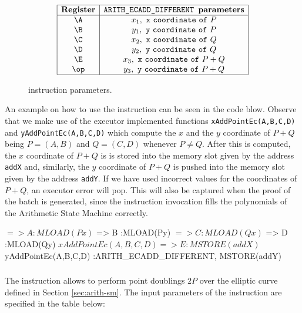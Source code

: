 \begin{figure}[h!]
    \renewcommand{\figurename}{Table}
    \[
    \begin{array}{|c|c|}
        \hline
        \mathbf{Register} &\texttt{ARITH\_ECADD\_DIFFERENT } \textbf{parameters} \\ \hline
        \A & x_1, \mathtt{~x~coordinate~of~}P \\
        \B & y_1, \mathtt{~y~coordinate~of~}P \\
        \C & x_2, \mathtt{~x~coordinate~of~}Q \\
        \D & y_2, \mathtt{~y~coordinate~of~}Q \\
        \E & x_3, \mathtt{~x~coordinate~of~}P+Q \\
        \op & y_3, \mathtt{~y~coordinate~of~}P+Q \\
        \hline
    \end{array}
    \]
    \caption{\ARITHADDDIFF instruction parameters.}
    \label{tab:memory-first-example}
\end{figure}

An example on how to use the \ARITHADDDIFF instruction can be seen in the code blow. Observe that we make use of the executor implemented functions \texttt{xAddPointEc(A,B,C,D)} and \texttt{yAddPointEc(A,B,C,D)} which compute the $x$ and the $y$ coordinate of $P + Q$ being $P = (A, B)$ and $Q = (C, D)$ whenever $P \neq Q$. After this is computed, the $x$ coordinate of $P + Q$ is is stored into the memory slot given by the address \texttt{addX} and, similarly, the $y$ coordinate of $P + Q$ is pushed into the memory slot given by the address \texttt{addY}. If we have used incorrect values for the coordinates of $P + Q$, an executor error will pop. This will also be captured when the proof of the batch is generated, since the instruction invocation fills the polynomials of the Arithmetic State Machine correctly. 

\begin{zkasm}
$ => A  						:MLOAD(Px)
$ => B  						:MLOAD(Py)
$ => C  						:MLOAD(Qx)
$ => D  						:MLOAD(Qy)
${xAddPointEc(A,B,C,D)} => E  	:MSTORE(addX)
${yAddPointEc(A,B,C,D)} 		:ARITH_ECADD_DIFFERENT, MSTORE(addY)
\end{zkasm}


\subsubsection{\ARITHADDSAME}

The \ARITHADDSAME instruction allows to perform point doublings $2P$ over the elliptic curve defined in Section \ref{sec:arith-sm}. The input parameters of the instruction are specified in the table below:

